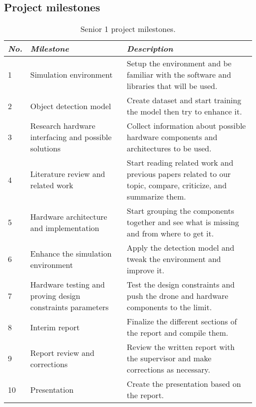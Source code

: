 \documentclass[../main.tex]{subfiles}
\begin{document}
\subsection{Project milestones}

\begin{table}[H]
    \centering
    \caption{Senior 1 project milestones.}
    \label{tab:milestones}
    \begin{tabularx}{\textwidth}{ X p{5cm} p{9cm} }
        \toprule

        \textit{No.} & \textit{Milestone} 
            & \textit{Description}
        \\

        \midrule

        1 & Simulation environment
            & Setup the environment and be familiar with the software and libraries that will be used.
        \\
        2 & Object detection model
            & Create dataset and start training the model then try to enhance it.
        \\
        3 & Research hardware interfacing and possible solutions
            & Collect information about possible hardware components and architectures to be used.
        \\
        4 & Literature review and related work
            & Start reading related work and previous papers related to our topic, compare, criticize, and summarize them.
        \\
        5 & Hardware architecture and implementation
            & Start grouping the components together and see what is missing and from where to get it.
        \\
        6 & Enhance the simulation environment
            & Apply the detection model and tweak the environment and improve it.
        \\
        7 & Hardware testing and proving design constraints parameters
            & Test the design constraints and push the drone and hardware components to the limit.
        \\
        8 & Interim report
            & Finalize the different sections of the report
            and compile them.
        \\
        9 & Report review and corrections
            & Review the written report with the supervisor
            and make corrections as necessary.
        \\
        10 & Presentation
            & Create the presentation based on the report.
        \\

        \bottomrule
    \end{tabularx}
\end{table}
\end{document}
